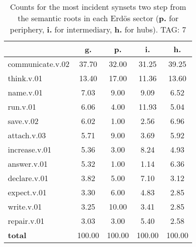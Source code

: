 \begin{table}[h!]
\begin{center}
\begin{tabular}{| l | c | c | c | c |}\hline
 & g. & p. & i. & h. \\\hline
communicate.v.02 & 37.70  & 32.00  & 31.25  & 39.25 \\\hline
think.v.01 & 13.40  & 17.00  & 11.36  & 13.60 \\\hline
name.v.01 & 7.03  & 9.00  & 9.09  & 6.52 \\\hline
run.v.01 & 6.06  & 4.00  & 11.93  & 5.04 \\\hline
save.v.02 & 6.02  & 1.00  & 2.56  & 6.96 \\\hline
attach.v.03 & 5.71  & 9.00  & 3.69  & 5.92 \\\hline
increase.v.01 & 5.36  & 3.00  & 8.24  & 4.93 \\\hline
answer.v.01 & 5.32  & 1.00  & 1.14  & 6.36 \\\hline
declare.v.01 & 3.82  & 5.00  & 7.10  & 3.12 \\\hline
expect.v.01 & 3.30  & 6.00  & 4.83  & 2.85 \\\hline
write.v.01 & 3.25  & 10.00  & 3.41  & 2.85 \\\hline
repair.v.01 & 3.03  & 3.00  & 5.40  & 2.58 \\\hline
{{\bf total}} & 100.00  & 100.00  & 100.00  & 100.00 \\\hline
\end{tabular}
\caption{Counts for the most incident synsets two step from the semantic roots in each Erd\"os sector ({\bf p.} for periphery, {\bf i.} for intermediary, {\bf h.} for hubs). TAG: 7}
\end{center}
\end{table}